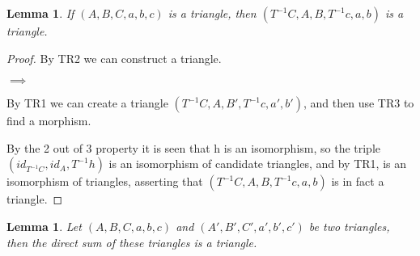 \documentclass[11pt]{article}
\newtheorem{lemma}[theorem]{Lemma}
\theoremstyle{definition}
\theoremstyle{remark}
\begin{document}
            \begin{lemma}
                If $(A,B,C,a,b,c)$ is a triangle, then $(T^{-1}C,A,B,T^{-1}c,a,b)$ is a triangle.
            \end{lemma}

            \begin{proof}
                By TR2 we can construct a triangle.
                \begin{center}
                    $\implies$
                \end{center}
                By TR1 we can create a triangle $(T^{-1}C,A,B',T^{-1}c,a',b')$, and then use TR3 to find a morphism.
                \begin{center}
                \end{center}
                By the 2 out of 3 property it is seen that h is an isomorphism, so the triple $(id_{T^{-1}C}, id_A, T^{-1}h)$ is an isomorphism of candidate triangles, and by TR1, is an isomorphism of triangles, asserting that $(T^{-1}C,A,B,T^{-1}c,a,b)$ is in fact a triangle.
            \end{proof}

            \begin{lemma}
                Let $(A,B,C,a,b,c)$ and $(A',B',C',a',b',c')$ be two triangles, then the direct sum of these triangles is a triangle.
            \end{lemma}
\end{document}
